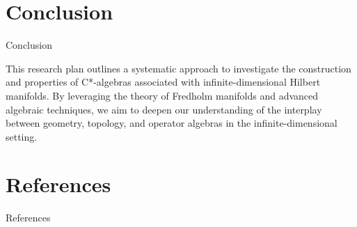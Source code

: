 \documentclass{beamer}
\begin{document}
\section{Conclusion}
\begin{frame}{Conclusion}
    \parbox{\textwidth}{
        This research plan outlines a systematic approach to investigate the construction and properties of C*-algebras associated with infinite-dimensional Hilbert manifolds. By leveraging the theory of Fredholm manifolds and advanced algebraic techniques, we aim to deepen our understanding of the interplay between geometry, topology, and operator algebras in the infinite-dimensional setting.
    }
\end{frame}
\section{References}
\begin{frame}[allowframebreaks]{References}
    \printbibliography
    \hyperlink{titlepage}{}
\end{frame} 
\end{document}

